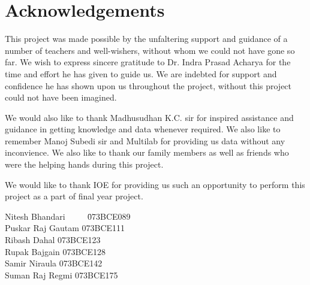 \chapter*{Acknowledgements}
This project was made possible by the unfaltering support and guidance of a number of teachers and well-wishers, without whom we could not have gone so far. We wish to express sincere gratitude to Dr. Indra Prasad Acharya for the time and effort he has given to guide us. We are indebted for support and confidence he has shown upon us throughout the project, without this project could not have been imagined.

We would also like to thank Madhusudhan K.C. sir for inspired assistance and guidance in getting knowledge and data whenever required. We also like to remember Manoj Subedi sir and Multilab for providing us data without any inconvience. We also like to thank our family members as well as friends who were the helping hands during this project.

We would like to thank IOE for providing us such an opportunity to perform this project as a part of final year project.

\begin{flushright}
\begin{minipage}[t]{0.48\linewidth}
	\vspace{0pt}
	 \begin{tabbing}
		Nitesh Bhandari ~~~~ \=  073BCE089\\
		Puskar Raj Gautam \>  073BCE111\\
		Ribash Dahal \>  073BCE123\\
		Rupak Bajgain \> 073BCE128\\
		Samir Niraula \> 073BCE142\\
		Suman Raj Regmi \> 073BCE175
	\end{tabbing}
\end{minipage}
\end{flushright}